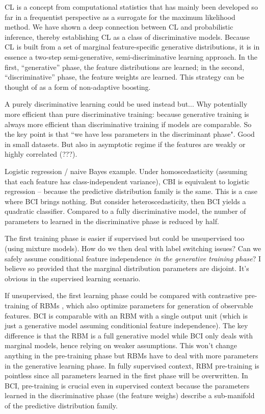 \documentclass[english]{scrartcl}
\begin{document}
CL is a concept from computational statistics that has mainly been developed so far in a frequentist perspective as a surrogate for the maximum likelihood method. We have shown a deep connection between CL and probabilistic inference, thereby establishing CL as a class of discriminative models. Because CL is built from a set of marginal feature-specific generative distributions, it is in essence a two-step semi-generative, semi-discriminative learning approach. In the first, ``generative'' phase, the feature distributions are learned; in the second, ``discriminative'' phase, the feature weights are learned. This strategy can be thought of as a form of non-adaptive boosting.


A purely discriminative learning could be used instead but...
Why potentially more efficient than pure discriminative training: because generative training is always more efficient than discriminative training if models are comparable. So the key point is that ``we have less parameters in the discriminant phase". Good in small datasets. But also in asymptotic regime if the features are weakly or highly correlated (???).

Logistic regression / naive Bayes example. Under homoscedasticity (assuming that each feature has class-independent variance), CBI is equivalent to logistic regression -- because the predictive distribution family is the same. This is a case where BCI brings nothing. But consider heteroscedasticity, then BCI yields a quadratic classifier. Compared to a fully discriminative model, the number of parameters to learned in the discriminative phase is reduced by half.

The first training phase is easier if supervised but could be unsupervised too (using mixture models). How do we then deal with label switching issues? Can we safely assume conditional feature independence {\em in the generative training phase}? I believe so provided that the marginal distribution parameters are disjoint. It's obvious in the supervised learning scenario.

If unsupervised, the first learning phase could be compared with contrastive pre-training of RBMs \cite{Hinton-06,Fischer-14}, which also optimize parameters for generation of observable features. BCI is comparable with an RBM with a single output unit (which is just a generative model assuming conditionial feature independence). The key difference is that the RBM is a full generative model while BCI only deals with marginal models, hence relying on weaker assumptions. This won't change anything in the pre-training phase but RBMs have to deal with more parameters in the generative learning phase. In fully supervised context, RBM pre-training is pointless since all parameters learned in the first phase will be overwritten. In BCI, pre-training is crucial even in supervised context because the parameters learned in the discriminative phase (the feature weighs) describe a sub-manifold of the predictive distribution family.
\end{document}
